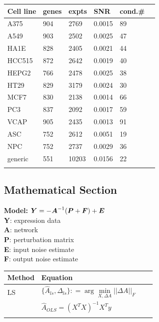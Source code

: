\documentclass[a0,portrait]{a0poster}
\begin{document}
\begin{multicols}{2}
\begin{multicols}{2}
\begin{tabular}{@{}llllll@{}}
\toprule
\textbf{Cell line} & \textbf{genes} & \textbf{expts} & \textbf{SNR} & \textbf{cond.\#} \\ \midrule
A375 &  904 & 2769 & 0.0015 & 89 \\
A549 &  903 & 2502 & 0.0025 & 47 \\
HA1E &  828 & 2405 & 0.0021 & 44 \\
HCC515 &  872 & 2642 & 0.0019 & 40 \\
HEPG2 &  766 & 2478 & 0.0025 & 38 \\
HT29 &  829 & 3179 & 0.0024 & 30 \\
MCF7 &  830 & 2138 & 0.0014 & 66 \\
PC3 &  837 & 2092 & 0.0017 & 59 \\
VCAP &  905 & 2435 & 0.0013 & 91 \\
ASC & 752 & 2612 & 0.0051 & 19 \\
NPC & 752 & 2737 & 0.0029 & 36 \\
generic & 551 & 10203 & 0.0156 & 22 \\ \bottomrule \\
\end{tabular}

\subsection*{Mathematical Section}

\textbf{Model:} $  {\boldsymbol{Y}} = -{\boldsymbol{A}}^{-1}({\boldsymbol{P}} +{\boldsymbol{F}}) + {\boldsymbol{E}}$\\
\textbf{Y}: expression data\\
\textbf{A}: network\\
\textbf{P}: perturbation matrix\\
\textbf{E}: input noise estimate\\
\textbf{F}: output noise estimate\\

\begin{tabular}{l l l l}
\toprule
\textbf{Method} & \textbf{Equation} \\
\midrule
LS & $\{ \hat{A}_{ls},\Delta _{ls} \}: = \arg \min\limits_{X,\Delta A} ||\Delta A||_F$ \\ 
& $\hat{A}_{OLS} = {{(X^TX)}^{-1} X^Ty}$ \\ \\


\end{tabular}
\end{multicols}
\end{multicols}
\end{document}
